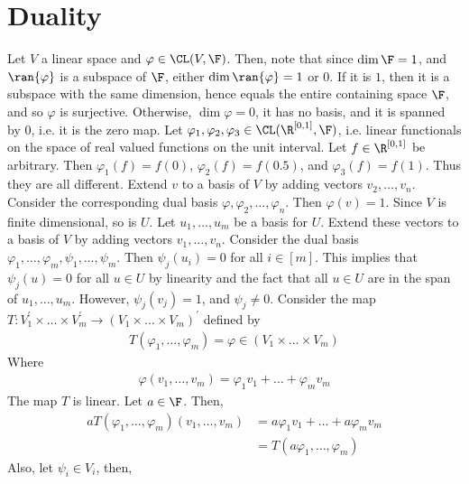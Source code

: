 \documentclass{book}
\begin{document}
\section{Duality}
  \begin{enumerate}[label=\arabic*)]
    \ii 
      Let $V$ a linear space and $\varphi \in \CL(V, \F)$. Then, note that since $\dim\F = 1$, and $\ran{\varphi}$ is a subspace of $\F$, either $\dim\ran{\varphi} = 1$ or $0$. If it is $1$,
      then it is a subspace with the same dimension, hence equals the entire containing space $\F$, and so $\varphi$ is surjective. Otherwise, $\dim\varphi = 0$, it has no basis, and it is
      spanned by $0$, i.e. it is the zero map.
    \ii
      Let $\varphi_1, \varphi_2, \varphi_3 \in \CL(\R^{[0, 1]}, \F)$, i.e. linear functionals on the space of real valued functions on the unit interval. Let $f \in \R^{[0, 1]}$ be
      arbitrary. Then $\varphi_1(f) = f(0)$, $\varphi_2(f) = f(0.5)$, and $\varphi_3(f) = f(1)$. Thus they are all different.
    \ii
      Extend $v$ to a basis of $V$ by adding vectors $v_2, \dots, v_n$. Consider the corresponding dual basis $\varphi, \varphi_2, \dots, \varphi_n$. Then $\varphi(v) = 1$.
    \ii
      Since $V$ is finite dimensional, so is $U$. Let $u_1, \dots, u_m$ be a basis for $U$. Extend these vectors to a basis of $V$ by adding vectors $v_1, \dots, v_n$. Consider the dual
      basis $\varphi_1, \dots, \varphi_m, \psi_1, \dots, \psi_m$. Then $\psi_j(u_i) = 0$ for all $i \in [m]$. This implies that $\psi_j(u) = 0$ for all $u \in U$ by linearity and the fact
      that all $u \in U$ are in the span of $u_1, \dots, u_m$. However, $\psi_j(v_j) = 1$, and $\psi_j \neq 0$.
    \ii
      Consider the map $T: V_1^{\prime} \times \dots \times V_m^{\prime} \to (V_1 \times \dots \times V_m)^{\prime}$ defined by
      \begin{align*}
        T(\varphi_1, \dots, \varphi_m) = \varphi \in (V_1 \times \dots \times V_m)
      \end{align*}
      Where 
      \begin{align*}
        \varphi(v_1, \dots, v_m) = \varphi_1v_1 + \dots + \varphi_mv_m
      \end{align*}
      The map $T$ is linear. Let $a \in \F$. Then,
      \begin{align*}
        aT(\varphi_1, \dots, \varphi_m)(v_1, \dots, v_m) & = a\varphi_1v_1 + \dots + a\varphi_mv_m \\
        & = T(a\varphi_1, \dots, \varphi_m)
      \end{align*}
      Also, let $\psi_i \in V_i$, then, 

\end{enumerate}
\end{document}
